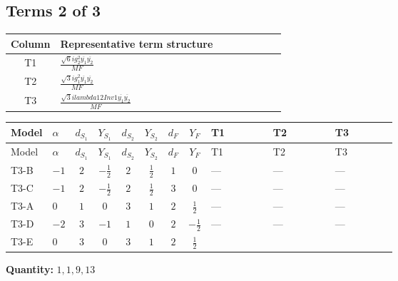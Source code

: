 \documentclass[8pt]{article}
\begin{document}
\begin{landscape}
\subsection*{Terms 2 of 3}
\begin{center}
\begin{tabular}{@{}c >{\raggedright\arraybackslash}p{0.82\linewidth}@{}}
\toprule
Column & Representative term structure \\
\midrule
T1 & \(\displaystyle \frac{\sqrt{6} i g_{2}^{2} \overline{y_{1}} \overline{y_{2}}}{MF}\) \\
\midrule
T2 & \(\displaystyle \frac{\sqrt{3} i g_{1}^{2} \overline{y_{1}} \overline{y_{2}}}{MF}\) \\
\midrule
T3 & \(\displaystyle \frac{\sqrt{3} i lambda12Inv1 \overline{y_{1}} \overline{y_{2}}}{MF}\) \\
\midrule
\bottomrule
\end{tabular}
\end{center}
\smallskip
\tiny
\begin{longtable}{@{}llcccccc >{\raggedright\arraybackslash}p{0.21\linewidth} >{\raggedright\arraybackslash}p{0.21\linewidth} >{\raggedright\arraybackslash}p{0.21\linewidth}@{}}
\toprule
Model & $\alpha$ & $d_{S_1}$ & $Y_{S_1}$ & $d_{S_2}$ & $Y_{S_2}$ & $d_F$ & $Y_F$ & T1 & T2 & T3 \\
\midrule
\endfirsthead
\toprule
Model & $\alpha$ & $d_{S_1}$ & $Y_{S_1}$ & $d_{S_2}$ & $Y_{S_2}$ & $d_F$ & $Y_F$ & T1 & T2 & T3 \\
\midrule
\endhead
T3-B & $-1$ & $2$ & $-\frac{1}{2}$ & $2$ & $\frac{1}{2}$ & $1$ & $0$ & --- & --- & --- \\
\midrule
T3-C & $-1$ & $2$ & $-\frac{1}{2}$ & $2$ & $\frac{1}{2}$ & $3$ & $0$ & --- & --- & --- \\
\midrule
T3-A & $0$ & $1$ & $0$ & $3$ & $1$ & $2$ & $\frac{1}{2}$ & --- & --- & --- \\
\midrule
T3-D & $-2$ & $3$ & $-1$ & $1$ & $0$ & $2$ & $-\frac{1}{2}$ & --- & --- & --- \\
\midrule
T3-E & $0$ & $3$ & $0$ & $3$ & $1$ & $2$ & $\frac{1}{2}$ & \scriptsize\adjustbox{max width=\linewidth}{$\begin{gathered} - \frac{\sqrt{6} i g_{2}^{2} \overline{y_{1}} \overline{y_{2}}}{3 MF}\end{gathered}$} & \scriptsize\adjustbox{max width=\linewidth}{$\begin{gathered} - \frac{\sqrt{3} i g_{1}^{2} \overline{y_{1}} \overline{y_{2}}}{8 MF}\end{gathered}$} & \scriptsize\adjustbox{max width=\linewidth}{$\begin{gathered} \frac{\sqrt{3} i lambda12Inv1 \overline{y_{1}} \overline{y_{2}}}{6 MF}\end{gathered}$} \\
\midrule
\bottomrule
\end{longtable}
\clearpage
\noindent\textbf{Quantity: }$\mathrm{1,1,9,13}$\par\smallskip

\end{landscape}
\end{document}
